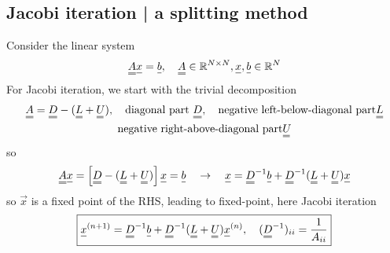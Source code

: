 

\subsection{Jacobi iteration | a splitting method}

Consider the linear system
\begin{equation}
    \mat{A} \vec{x} = \vec{b}, \quad \mat{A} \in \mathbb{R}^{N\times N}, \vec{x}, \vec{b} \in \mathbb{R}^N
\end{equation}
For Jacobi iteration, we start with the trivial decomposition
\begin{equation}
    \begin{gathered}
        \mat{A} = \mat{D} - (\mat{L} + \mat{U}), \quad \text{diagonal part } \mat{D}, \quad \text{negative left-below-diagonal part} \mat{L} \\
        \text{negative right-above-diagonal part} \mat{U}
    \end{gathered}
\end{equation}
so
\begin{equation}
    \mat{A}\vec{x} = \left[ \mat{D} - (\mat{L} + \mat{U}) \right] \vec{x} = \vec{b} \quad \rightarrow \quad \vec{x} = \mat{D}^{-1} \vec{b} + \mat{D}^{-1} (\mat{L} + \mat{U}) \vec{x}
\end{equation}
so $\vec{x}$ is a fixed point of the RHS, leading to fixed-point, here \textcolor{blue1}{Jacobi iteration}
\begin{equation}
    \boxed{\vec{x}^{(n+1)} = \mat{D}^{-1} \vec{b} + \mat{D}^{-1} (\mat{L} + \mat{U}) \vec{x}^{(n)}, \quad (\mat{D}^{-1})_{ii} = \frac{1}{A_{ii}}}
\end{equation}

